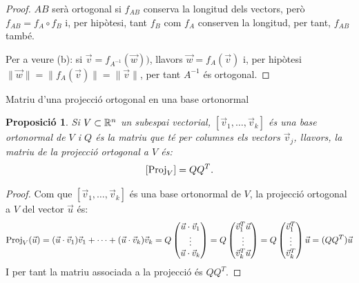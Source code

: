 \documentclass[
  11pt,
]{book}
\makeatletter
\numberwithin{dummy}{section}
\theoremstyle{maincolornumbox}
\theoremstyle{blacknumex}
\theoremstyle{blacknumbox}
\theoremstyle{maincolornum}
\newtheorem{propositionT}{Proposició}[chapter]
\newenvironment{proposition}{\begin{pBox}\begin{propositionT}}{\end{propositionT}\end{pBox}}
\renewcommand{\section}{\@startsection{section}{1}{\z@}
{-4ex \@plus -1ex \@minus -.4ex}
{1ex \@plus.2ex }
{\normalfont\large\sffamily\bfseries}}
\newlength\esp
\makeatother
\begin{document}
\begin{proof}
\(AB\) serà ortogonal si \(f_{AB}\) conserva la longitud dels
vectors, però \(f_{AB}=f_A \circ f_B\) i, per hipòtesi, tant \(f_B\) com
\(f_A\) conserven la longitud, per tant, \(f_{AB}\) també.

Per a veure (b): si \(\vec v = f_{A^{-1}}(\vec w))\), llavors
\(\vec w=f_A(\vec v)\) i, per hipòtesi
\(\|\vec w\|=\|f_A(\vec v)\|=\|\vec v\|\), per tant \(A^{-1}\) és
ortogonal.
\end{proof}

\hypertarget{matriu-duna-projecciuxf3-ortogonal-en-una-base-ortonormal}{%
\section{Matriu d'una projecció ortogonal en una base ortonormal}\label{matriu-duna-projecciuxf3-ortogonal-en-una-base-ortonormal}}

\begin{proposition}
Si \(V\subset \mathbb{R}^n\) un subespai vectorial, \([\vec v_1, \dots, \vec v_k]\)
és una base ortonormal de \(V\) i \(Q\) és la matriu que té per columnes els
vectors \(\vec v_j\), llavors, la matriu de la projecció ortogonal a \(V\)
és: \[[\operatorname{Proj}_V]=Q Q^T.\]
\end{proposition}

\begin{proof}
Com que \([\vec v_1, \dots, \vec v_k]\) és una base ortonormal de
\(V\), la projecció ortogonal a \(V\) del vector \(\vec u\) és:
\[\operatorname{Proj}_V(\vec u)=(\vec u\cdot \vec v_1)\vec v_1 + \cdots + (\vec u\cdot \vec v_k)\vec v_k = Q \begin{pmatrix}
 \vec u\cdot \vec v_1 \\ \vdots \\ \vec u\cdot \vec v_k \end{pmatrix}= Q \begin{pmatrix}
 \vec v_1^T \vec u \\ \vdots \\ \vec v_k^T \vec u
 \end{pmatrix} = Q
 \begin{pmatrix}
 \vec v_1^T \\
 \vdots \\
 \vec v_k^T
 \end{pmatrix} \vec u
 =(QQ^T)\vec u\] I per tant la matriu associada a la projecció és
\(QQ^T\).
\end{proof}
\end{document}
